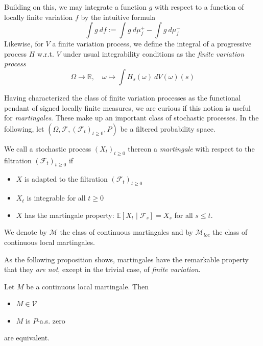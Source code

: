 Building on this, we may integrate a function $g$  with respect to a function of locally finite variation $f$ by the intuitive formula
\begin{equation*}
	\int g \ df := \int g \ d \mu^+_f - \int g \ d \mu^-_f
\end{equation*}
Likewise, for $V$ a finite variation process, we define the integral of a progressive process $H$ w.r.t. $V$ under usual integrability conditions as the \emph{finite variation process} \cite[lemma 1.37]{PTSA}
\begin{equation*}
	\Omega \rightarrow \mathbb{R}, \quad \omega \mapsto \int H_s(\omega) \ d V(\omega)(s)
\end{equation*}
\par

Having characterized the class of finite variation processes as the functional pendant of signed locally finite measures, we are curious if this notion is useful for \emph{martingales}. These make up an important class of stochastic processes.
In the following, let $(\Omega, \mathcal{F}, (\mathcal{F}_t)_{t \geq 0}, P)$ be a filtered probability space. 
\begin{definition} We call a stochastic process $(X_t)_{t \geq 0}$ thereon a \emph{martingale} with respect to the filtration $(\mathcal{F}_t)_{t \geq 0}$ if 
		\begin{itemize}
			\item $X$ is adapted to the filtration $(\mathcal{F}_t)_{t \geq 0}$
			\item $X_t$ is integrable for all $t \geq 0$
			\item $X$ has the martingale property: $\mathbb{E}[X_t \mid \mathcal{F}_s] = X_s$ for all $s \leq t$.
		\end{itemize}
	\end{definition}
	We denote by $\mathcal{M}$ the class of continuous martingales and by $\mathcal{M}_{loc}$ the class of continuous local martingales. \par
	As the following proposition shows, martingales have the remarkable property that they \emph{are not}, except in the trivial case, of \emph{finite variation}.
		\begin{proposition}\cite[Prop. 18.2]{Kallenberg}
			Let $M$ be a continuous local martingale. Then 
			\begin{itemize}
				\item $M \in \mathcal{V}$
				\item $M$ is $P$-a.s. zero
			\end{itemize}
			are equivalent.
		\end{proposition}


